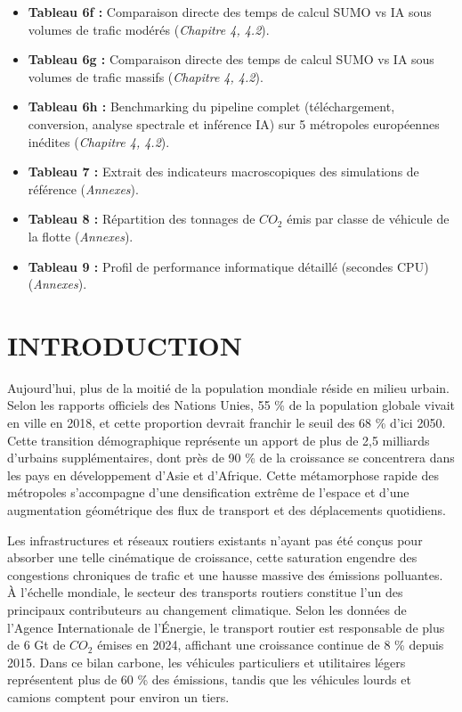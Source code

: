 \documentclass[10pt, a4paper]{article}
\begin{document}
\begin{itemize}
  \textbf{Tableau 6b :} Matrice comparative de la validation croisée
  étendue (IA vs SUMO) sur 9 villes inédites sous 3 scénarios de charge
  (\emph{Chapitre 4, 4.2}).
\item
  \textbf{Tableau 6f :} Comparaison directe des temps de calcul SUMO vs
  IA sous volumes de trafic modérés (\emph{Chapitre 4, 4.2}).
\item
  \textbf{Tableau 6g :} Comparaison directe des temps de calcul SUMO vs
  IA sous volumes de trafic massifs (\emph{Chapitre 4, 4.2}).
\item
  \textbf{Tableau 6h :} Benchmarking du pipeline complet
  (téléchargement, conversion, analyse spectrale et inférence IA) sur 5
  métropoles européennes inédites (\emph{Chapitre 4, 4.2}).
\item
  \textbf{Tableau 7 :} Extrait des indicateurs macroscopiques des
  simulations de référence (\emph{Annexes}).
\item
  \textbf{Tableau 8 :} Répartition des tonnages de \(CO_2\) émis par
  classe de véhicule de la flotte (\emph{Annexes}).
\item
  \textbf{Tableau 9 :} Profil de performance informatique détaillé
  (secondes CPU) (\emph{Annexes}).
\end{itemize}

\newpage

\section{INTRODUCTION}\label{introduction}

Aujourd'hui, plus de la moitié de la population mondiale réside en
milieu urbain. Selon les rapports officiels des Nations Unies, 55 \% de
la population globale vivait en ville en 2018, et cette proportion
devrait franchir le seuil des 68 \% d'ici 2050. Cette transition
démographique représente un apport de plus de 2,5 milliards d'urbains
supplémentaires, dont près de 90 \% de la croissance se concentrera dans
les pays en développement d'Asie et d'Afrique. Cette métamorphose rapide
des métropoles s'accompagne d'une densification extrême de l'espace et
d'une augmentation géométrique des flux de transport et des déplacements
quotidiens.

Les infrastructures et réseaux routiers existants n'ayant pas été conçus
pour absorber une telle cinématique de croissance, cette saturation
engendre des congestions chroniques de trafic et une hausse massive des
émissions polluantes. À l'échelle mondiale, le secteur des transports
routiers constitue l'un des principaux contributeurs au changement
climatique. Selon les données de l'Agence Internationale de l'Énergie,
le transport routier est responsable de plus de 6 Gt de \(CO_2\) émises
en 2024, affichant une croissance continue de 8 \% depuis 2015. Dans ce
bilan carbone, les véhicules particuliers et utilitaires légers
représentent plus de 60 \% des émissions, tandis que les véhicules
lourds et camions comptent pour environ un tiers.
\end{document}
